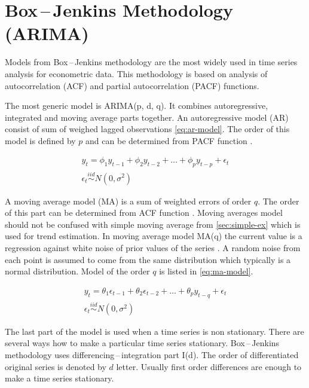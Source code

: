     \section{Box\,--\,Jenkins Methodology (ARIMA)} \label{sec:arima}
    Models from Box\,--\,Jenkins methodology are the most widely used in time series analysis for econometric data.
    This methodology is based on analysis of autocorrelation (ACF) and partial autocorrelation (PACF) functions.
    
    The most generic model is ARIMA(p, d, q). It combines autoregressive, integrated and moving average parts together.
    An autoregressive model (AR) consist of sum of weighed lagged observations \ref{eq:ar-model}.
    The order of this model is defined by $p$ and can be determined from PACF function \cite{cipra}.

    \begin{gather} \label{eq:ar-model}
        y_t = \phi_1 y_{t-1} + \phi_2 y_{t-2} + \dots + \phi_p y_{t-p} + \epsilon_t \\ \nonumber
        \epsilon_t \overset{iid}{\sim} N(0, \sigma^2)
    \end{gather}

    A moving average model (MA) is a sum of weighted errors of order $q$. The order of this part can be determined
    from ACF function \cite{cipra}. Moving averages model should not be confused with simple moving average from
    \ref{sec:simple-ex} which is used for trend estimation. In moving average model MA(q) the current value is a
    regression against white noise of prior values of the series \cite{wiki-ma-model}. A random noise from each
    point is assumed to come from the same distribution which typically is a normal distribution.  Model of the order
    $q$ is listed in \ref{eq:ma-model}.

    \begin{gather} \label{eq:ma-model}
        y_t = \theta_1 \epsilon_{t-1} + \theta_2 \epsilon_{t-2} + \dots + \theta_p y_{t-q} + \epsilon_t \\ \nonumber
        \epsilon_t \overset{iid}{\sim} N(0, \sigma^2)
    \end{gather}

    The last part of the model is used when a time series is non stationary. There are several ways how to make a
    particular time series stationary. Box\,--\,Jenkins methodology uses differencing\,--\,integration part I(d).  The
    order of differentiated original series is denoted by $d$ letter. Usually first order differences are enough to
    make a time series stationary.

